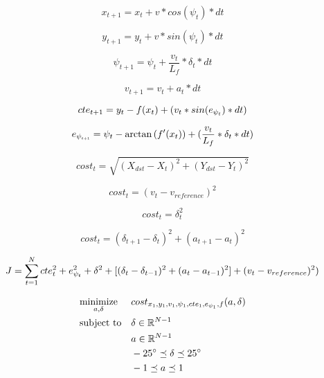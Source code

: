 \documentclass[paper=a4, fontsize=11pt]{scrartcl} %
\begin{document}
$$x_{t+1} = x_t + v * cos(\psi_t) * dt$$

$$y_{t+1} = y_t + v * sin(\psi_t) * dt$$

$$\psi_{t+1} = \psi_{t} + \frac{v_t}{L_f} * \delta_t * dt $$

$$ v_{t+1} = v_t + a_t * dt $$

$$ cte_{t+1} = y_t - f(x_t) + (v_t * sin(e_{\psi_{\scaleto{t}{3pt}}}) * dt)$$

$$ e_{\psi_{\scaleto{t+1}{3pt}}} = \psi_t - \arctan{(f'(x_t))} + (\frac{v_t}{L_f} * \delta_t * dt)$$

$$ cost_t = \sqrt{(X_{dst} - X_t)^2 + (Y_{dst} - Y_t)^2}$$

$$ cost_t = (v_t - v_{reference})^2$$

$$ cost_t = \delta_t^2$$

$$ cost_t = (\delta_{t+1} - \delta_t)^2 + (a_{t+1} - a_t)^2 $$

$$ J = \sum_{t=1}^N cte_t^2 + e_{\psi_{\scaleto{t}{3pt}}}^2 + \delta^2 + [(\delta_t - \delta_{t-1}) ^2 + (a_t - a_{t-1})^2] + (v_t - v_{reference})^2) $$

\begin{equation*}
\begin{aligned}
& \underset{a, \delta}{\text{minimize}}
& & cost_{x_{\scaleto{1}{3pt}}, y_{\scaleto{1}{3pt}}, v_{\scaleto{1}{3pt}}, \psi_{\scaleto{1}{3pt}}, cte_{\scaleto{1}{3pt}}, e_{\psi_{\scaleto{1}{3pt}}}, f}(a, \delta)\\
& \text{subject to}
& & \delta \in \mathbb{R}^{N-1} \\
& & & a \in \mathbb{R}^{N-1} \\
& & & \ang{-25} \preceq \delta \preceq \ang{25} \\
& & & -1 \preceq a \preceq 1 \\
\end{aligned}
\end{equation*}
\end{document}
